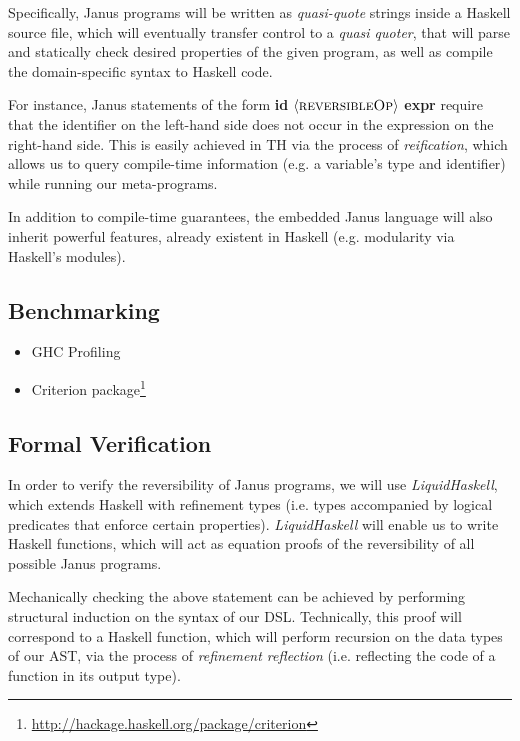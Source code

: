 \documentclass[12pt,a4paper]{article}
\newcommand{\site}[1]{\footnote{\url{#1}}}
\begin{document}
Specifically, Janus programs will be written as \textit{quasi-quote} strings inside a Haskell source file, which will eventually transfer control to a \textit{quasi quoter}, that will parse and statically check desired properties of the given program, as well as compile the domain-specific syntax to Haskell code.

For instance, Janus statements of the form \textbf{id} $\langle\textsc{reversibleOp}\rangle$ \textbf{expr} require that the identifier on the left-hand side does not occur in the expression on the right-hand side. This is easily achieved in TH via the process of \textit{reification}, which allows us to query compile-time information (e.g. a variable's type and identifier) while running our meta-programs.

In addition to compile-time guarantees, the embedded Janus language will also inherit powerful features, already existent in Haskell (e.g. modularity via Haskell's modules).
	
\subsection{Benchmarking}
	\begin{itemize}
		\item{GHC Profiling}
		\item{Criterion package\site{http://hackage.haskell.org/package/criterion}}
	\end{itemize}

\subsection{Formal Verification}
In order to verify the reversibility of Janus programs, we will use \textit{LiquidHaskell}, which extends Haskell with refinement types (i.e. types accompanied by logical predicates that enforce certain properties). \textit{LiquidHaskell} will enable us to write Haskell functions, which will act as equation proofs of the reversibility of all possible Janus programs.

Mechanically checking the above statement can be achieved by performing structural induction on the syntax of our DSL. Technically, this proof will correspond to a Haskell function, which will perform recursion on the data types of our AST, via the process of \textit{refinement reflection} (i.e. reflecting the code of a function in its output type).
\end{document}
